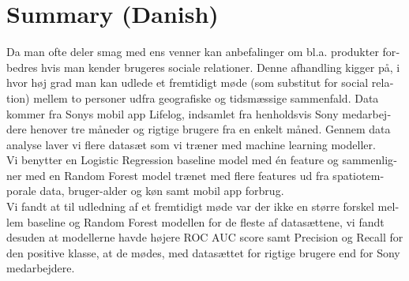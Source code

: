 \chapter{Summary (Danish)}
\begin{otherlanguage}{danish}
Da man ofte deler smag med ens venner kan anbefalinger om bl.a. produkter forbedres hvis man kender brugeres sociale relationer.
Denne afhandling kigger på, i hvor høj grad man kan udlede et fremtidigt møde (som substitut for social relation) mellem to personer udfra geografiske og tidsmæssige sammenfald.
Data kommer fra Sonys mobil app Lifelog, indsamlet fra henholdsvis Sony medarbejdere henover tre måneder og rigtige brugere fra en enkelt måned.
Gennem data analyse laver vi flere datasæt som vi træner med machine learning modeller.\\
Vi benytter en Logistic Regression baseline model med én feature og sammenligner med en Random Forest model trænet med flere features ud fra spatiotemporale data, bruger-alder og køn samt mobil app forbrug. \\
Vi fandt at til udledning af et fremtidigt møde var der ikke en større forskel mellem baseline og Random Forest modellen for de fleste af datasættene, vi fandt desuden at modellerne havde højere ROC AUC score samt Precision og Recall for den positive klasse, at de mødes, med datasættet for rigtige brugere end for Sony medarbejdere.

\end{otherlanguage}